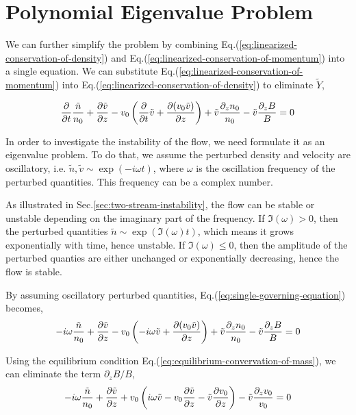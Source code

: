 \section{Polynomial Eigenvalue Problem}
We can further simplify the problem by combining Eq.(\ref{eq:linearized-conservation-of-density}) and Eq.(\ref{eq:linearized-conservation-of-momentum}) into a single equation. We can substitute Eq.(\ref{eq:linearized-conservation-of-momentum}) into Eq.(\ref{eq:linearized-conservation-of-density}) to eliminate $\tilde{Y}$,

\begin{equation} \label{eq:single-governing-equation}
    \pdv{t}\frac{\tilde{n}}{n_0}
    + \pdv{\tilde{v}}{z} - v_0\left(\pdv{t}\tilde{v}
    + \pdv{(v_0\tilde{v})}{z}\right)
    + \tilde{v}\frac{\partial_z n_0}{n_0}
    - \tilde{v}\frac{\partial_z B}{B}
    = 0
\end{equation}

In order to investigate the instability of the flow, we need formulate it as an eigenvalue problem. To do that, we assume the perturbed density and velocity are oscillatory, i.e. $\tilde{n}, \tilde{v} \sim \exp(-i\omega t)$, where $\omega$ is the oscillation frequency of the perturbed quantities. This frequency can be a complex number.

As illustrated in Sec.\ref{sec:two-stream-instability}, the flow can be stable or unstable depending on the imaginary part of the frequency. If $\Im(\omega) > 0$, then the perturbed quantities $\tilde{n} \sim \exp(\Im(\omega) t)$, which means it grows exponentially with time, hence unstable. If $\Im(\omega) \leq 0$, then the amplitude of the perturbed quanties are either unchanged or exponentially decreasing, hence the flow is stable.

By assuming oscillatory perturbed quantities, Eq.(\ref{eq:single-governing-equation}) becomes,
\begin{equation}
    -i\omega\frac{\tilde{n}}{n_0}
    + \pdv{\tilde{v}}{z} - v_0\left(-i\omega\tilde{v}
    + \pdv{(v_0\tilde{v})}{z}\right)
    + \tilde{v}\frac{\partial_z n_0}{n_0}
    - \tilde{v}\frac{\partial_z B}{B}
    = 0
\end{equation}

Using the equilibrium condition Eq.(\ref{eq:equilibrium-convervation-of-mass}), we can eliminate the term $\partial_z B/B$,
\[
    -i\omega\frac{\tilde{n}}{n_0}
    + \pdv{\tilde{v}}{z}
    + v_0\left(i\omega \tilde{v} - v_0\pdv{\tilde{v}}{z} - \tilde{v}\pdv{v_0}{z} \right)
    - \tilde{v}\frac{\partial_z v_0}{v_0}
    = 0
\]

